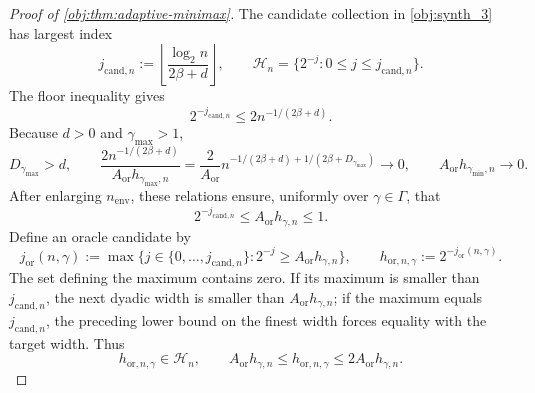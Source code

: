 \begin{proof}[Proof of \cref{obj:thm:adaptive-minimax}]
The candidate collection in \cref{obj:synth_3} has largest index
\[
j_{\mathrm{cand},n}
:=\left\lfloor\frac{\log_2 n}{2\beta+d}\right\rfloor,
\qquad
\mathcal H_n=\{2^{-j}:0\le j\le j_{\mathrm{cand},n}\}.
\]
The floor inequality gives
\[
2^{-j_{\mathrm{cand},n}}
\le2n^{-1/(2\beta+d)}.
\]
Because \(d>0\) and \(\gamma_{\max}>1\),
\[
D_{\gamma_{\max}}>d,
\qquad
\frac{2n^{-1/(2\beta+d)}}{A_{\mathrm{or}}h_{\gamma_{\max},n}}
=\frac2{A_{\mathrm{or}}}
 n^{-1/(2\beta+d)+1/(2\beta+D_{\gamma_{\max}})}
\longrightarrow0,
\qquad
A_{\mathrm{or}}h_{\gamma_{\min},n}\longrightarrow0.
\]
After enlarging \(n_{\mathrm{env}}\), these relations ensure, uniformly over \(\gamma\in\Gamma\), that
\[
2^{-j_{\mathrm{cand},n}}
\le A_{\mathrm{or}}h_{\gamma,n}\le1.
\]
Define an oracle candidate by
\[
j_{\mathrm{or}}(n,\gamma)
:=\max\{j\in\{0,\ldots,j_{\mathrm{cand},n}\}:
2^{-j}\ge A_{\mathrm{or}}h_{\gamma,n}\},
\qquad
h_{\mathrm{or},n,\gamma}:=2^{-j_{\mathrm{or}}(n,\gamma)}.
\]
The set defining the maximum contains zero. If its maximum is smaller than \(j_{\mathrm{cand},n}\), the next dyadic width is smaller than \(A_{\mathrm{or}}h_{\gamma,n}\); if the maximum equals \(j_{\mathrm{cand},n}\), the preceding lower bound on the finest width forces equality with the target width. Thus
\[
h_{\mathrm{or},n,\gamma}\in\mathcal H_n,
\qquad
A_{\mathrm{or}}h_{\gamma,n}
\le h_{\mathrm{or},n,\gamma}
\le2A_{\mathrm{or}}h_{\gamma,n}.
\]


\end{proof}
